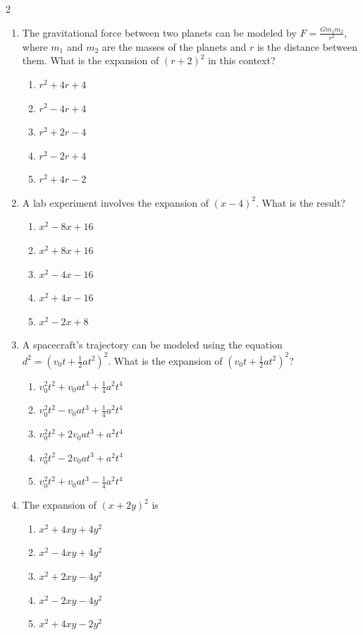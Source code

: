 \documentclass[10pt]{article}
\begin{document}
\begin{multicols}{2}
\begin{enumerate}[label=\textbf{Q\arabic*.}, leftmargin=*, itemsep=6pt, parsep=0pt]
  \item \small The gravitational force between two planets can be modeled by $F = \frac{Gm_1m_2}{r^2}$, where $m_1$ and $m_2$ are the masses of the planets and $r$ is the distance between them. What is the expansion of $(r + 2)^2$ in this context?
  \begin{enumerate}[label=(\Alph*), leftmargin=0.6cm, nosep, itemsep=2pt]
    \item $r^2 + 4r + 4$
    \item $r^2 - 4r + 4$
    \item $r^2 + 2r - 4$
    \item $r^2 - 2r + 4$
    \item $r^2 + 4r - 2$
  \end{enumerate}

  \item \small A lab experiment involves the expansion of $(x - 4)^2$. What is the result?
  \begin{enumerate}[label=(\Alph*), leftmargin=0.6cm, nosep, itemsep=2pt]
    \item $x^2 - 8x + 16$
    \item $x^2 + 8x + 16$
    \item $x^2 - 4x - 16$
    \item $x^2 + 4x - 16$
    \item $x^2 - 2x + 8$
  \end{enumerate}

  \item \small A spacecraft's trajectory can be modeled using the equation $d^2 = (v_0t + \frac{1}{2}at^2)^2$. What is the expansion of $(v_0t + \frac{1}{2}at^2)^2$?
  \begin{enumerate}[label=(\Alph*), leftmargin=0.6cm, nosep, itemsep=2pt]
    \item $v_0^2t^2 + v_0at^3 + \frac{1}{4}a^2t^4$
    \item $v_0^2t^2 - v_0at^3 + \frac{1}{4}a^2t^4$
    \item $v_0^2t^2 + 2v_0at^3 + a^2t^4$
    \item $v_0^2t^2 - 2v_0at^3 + a^2t^4$
    \item $v_0^2t^2 + v_0at^3 - \frac{1}{4}a^2t^4$
  \end{enumerate}

  \item \small The expansion of $(x + 2y)^2$ is
  \begin{enumerate}[label=(\Alph*), leftmargin=0.6cm, nosep, itemsep=2pt]
    \item $x^2 + 4xy + 4y^2$
    \item $x^2 - 4xy + 4y^2$
    \item $x^2 + 2xy - 4y^2$
    \item $x^2 - 2xy - 4y^2$
    \item $x^2 + 4xy - 2y^2$
  \end{enumerate}


\end{enumerate}
\end{multicols}
\end{document}
